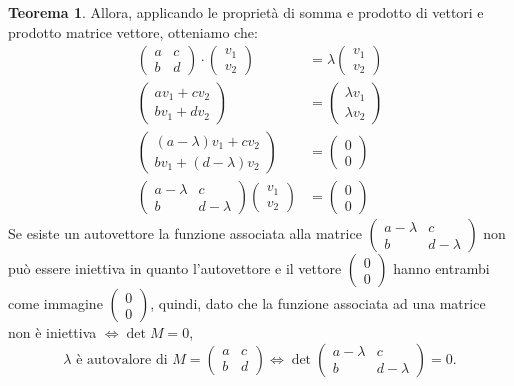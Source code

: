 \documentclass[10pt,a4paper]{article}
\theoremstyle{plain}
\theoremstyle{definition}
\newtheorem{teorema}[subsection]{Teorema}
\begin{document}
\begin{teorema}
Allora, applicando le proprietà di somma e prodotto di vettori e prodotto matrice vettore, otteniamo che:
\begin{align*}
	\begin{pmatrix}
	a & c \\ b & d
	\end{pmatrix}
	\cdot
	\begin{pmatrix}
	v_1 \\ v_2
	\end{pmatrix}
	&=
	\lambda
	\begin{pmatrix}
		v_1 \\ v_2
	\end{pmatrix}
	\\
	\begin{pmatrix}
	av_1 + cv_2 \\ bv_1 + dv_2
	\end{pmatrix}
	&=
	\begin{pmatrix}
	\lambda v_1 \\ \lambda v_2
	\end{pmatrix}
	\\
	\begin{pmatrix}
	(a-\lambda)v_1 + cv_2 \\ bv_1 + (d-\lambda)v_2
	\end{pmatrix}
	&=
	\begin{pmatrix}
		0  \\ 0
	\end{pmatrix}
	\\
	\begin{pmatrix}
		a-\lambda & c \\ b & d-\lambda
	\end{pmatrix}
	\begin{pmatrix}
		v_1 \\ v_2
	\end{pmatrix}
	&=
	\begin{pmatrix}
		0 \\ 0
	\end{pmatrix}
\end{align*}
Se esiste un autovettore la funzione associata alla matrice $\begin{pmatrix}
a-\lambda & c \\ b & d-\lambda
\end{pmatrix}$ non può essere iniettiva in quanto l'autovettore e il vettore $\begin{pmatrix}
	0 \\ 0
\end{pmatrix}$ hanno entrambi come immagine $\begin{pmatrix}
	0 \\ 0
\end{pmatrix}$, quindi, dato che la funzione associata ad una matrice non è iniettiva $\Leftrightarrow \det{M}=0$, 
\[
\lambda \text{ è autovalore di }M = \begin{pmatrix}
	a & c \\ b & d
\end{pmatrix} \Leftrightarrow \det{\begin{pmatrix}
	a-\lambda & c \\ b & d-\lambda
\end{pmatrix}}=0\text{.}
\]


\end{teorema}
\end{document}
